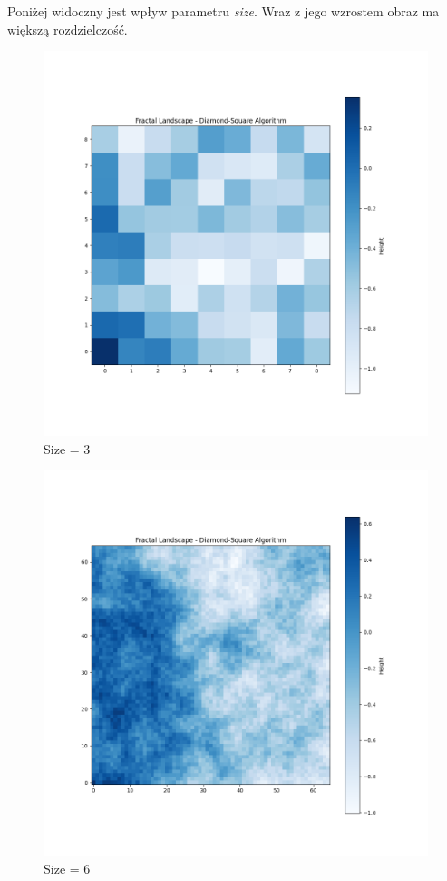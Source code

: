 \documentclass{article}
\begin{document}
Poniżej widoczny jest wpływ parametru \textit{size}. Wraz z jego wzrostem obraz ma większą rozdzielczość.

\begin{figure}[H]
    \centering
    \includegraphics[width=0.7\linewidth]{Blues_3_0.7.png}
    \caption{Size = 3}
\end{figure}

\begin{figure}[H]
    \centering
    \includegraphics[width=0.7\linewidth]{Blues_6_0.7.png}
    \caption{Size = 6}
\end{figure}
\end{document}
